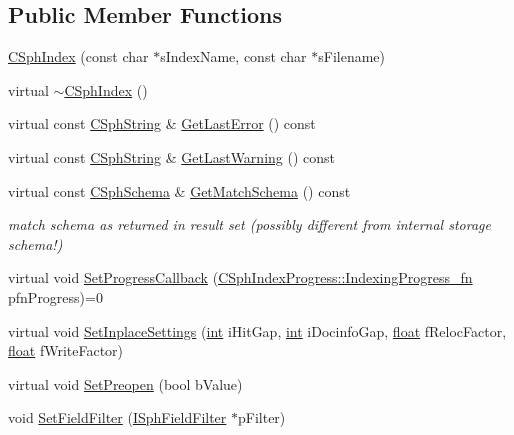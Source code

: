 \subsection*{Public Member Functions}
\begin{DoxyCompactItemize}
\item 
\hyperlink{classCSphIndex_a8a0993d0c06622d5aefa4c339bb31ce4}{C\-Sph\-Index} (const char $\ast$s\-Index\-Name, const char $\ast$s\-Filename)
\item 
virtual \hyperlink{classCSphIndex_a2c0e126373f7d8ea9353649b69434268}{$\sim$\-C\-Sph\-Index} ()
\item 
virtual const \hyperlink{structCSphString}{C\-Sph\-String} \& \hyperlink{classCSphIndex_aa6c4f86ceb64733762450a5a37ba15d8}{Get\-Last\-Error} () const 
\item 
virtual const \hyperlink{structCSphString}{C\-Sph\-String} \& \hyperlink{classCSphIndex_ab5b2806c50d4faa6c78b2293c2c71bbc}{Get\-Last\-Warning} () const 
\item 
virtual const \hyperlink{classCSphSchema}{C\-Sph\-Schema} \& \hyperlink{classCSphIndex_aa054a28f9b42f9a5cf4d7083d43cd21b}{Get\-Match\-Schema} () const 
\begin{DoxyCompactList}\small\item\em match schema as returned in result set (possibly different from internal storage schema!) \end{DoxyCompactList}\item 
virtual void \hyperlink{classCSphIndex_a787668511b48ea883bb2e9a9721a8652}{Set\-Progress\-Callback} (\hyperlink{structCSphIndexProgress_ae4d818fe1ea74a250088fcc7b77fdf63}{C\-Sph\-Index\-Progress\-::\-Indexing\-Progress\-\_\-fn} pfn\-Progress)=0
\item 
virtual void \hyperlink{classCSphIndex_ad6b113422fe3f1af9f26f68d1aa6e531}{Set\-Inplace\-Settings} (\hyperlink{sphinxexpr_8cpp_a4a26e8f9cb8b736e0c4cbf4d16de985e}{int} i\-Hit\-Gap, \hyperlink{sphinxexpr_8cpp_a4a26e8f9cb8b736e0c4cbf4d16de985e}{int} i\-Docinfo\-Gap, \hyperlink{sphinxexpr_8cpp_a0e0d0739f7035f18f949c2db2c6759ec}{float} f\-Reloc\-Factor, \hyperlink{sphinxexpr_8cpp_a0e0d0739f7035f18f949c2db2c6759ec}{float} f\-Write\-Factor)
\item 
virtual void \hyperlink{classCSphIndex_ab19c806848d3ff986286c5cc13d1551a}{Set\-Preopen} (bool b\-Value)
\item 
void \hyperlink{classCSphIndex_a738e7f5b623f439bfe8c2ece869ff417}{Set\-Field\-Filter} (\hyperlink{classISphFieldFilter}{I\-Sph\-Field\-Filter} $\ast$p\-Filter)
\item 

\end{DoxyCompactItemize}
